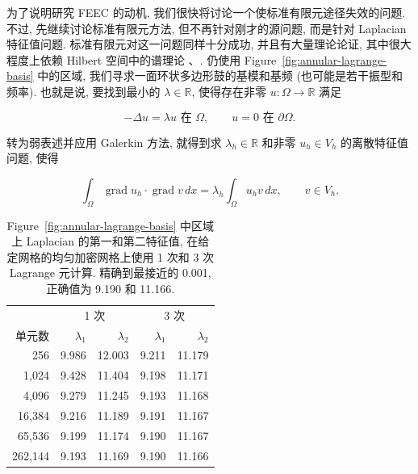 {为了说明研究 FEEC 的动机, 我们很快将讨论一个使标准有限元途径失效的问题. 不过, 先继续讨论标准有限元方法, 但不再针对刚才的源问题, 而是针对 Laplacian 特征值问题. 标准有限元对这一问题同样十分成功, 并且有大量理论论证, 其中很大程度上依赖 Hilbert 空间中的谱理论 、. 仍使用 Figure~\ref{fig:annular-lagrange-basis} 中的区域, 我们寻求一面环状多边形鼓的基模和基频 (也可能是若干振型和频率). 也就是说, 要找到最小的 $\lambda\in\mathbb R$, 使得存在非零 $u:\Omega\to\mathbb R$ 满足}

\begin{equation}\label{eq:scalar-laplacian-eigenproblem}
-\Delta u=\lambda u\text{{ 在 }}\Omega,\qquad u=0\text{{ 在 }}\partial\Omega.
\end{equation}

{转为弱表述并应用 Galerkin 方法, 就得到求 $\lambda_h\in\mathbb R$ 和非零 $u_h\in V_h$ 的离散特征值问题, 使得}

\[
\int_\Omega\operatorname{grad}u_h\cdot\operatorname{grad}v\,dx=\lambda_h\int_\Omega u_hv\,dx,\qquad v\in V_h.
\]

\begin{table}[H]\centering
\caption{{Figure~\ref{fig:annular-lagrange-basis} 中区域上 Laplacian 的第一和第二特征值, 在给定网格的均匀加密网格上使用 1 次和 3 次 Lagrange 元计算. 精确到最接近的 0.001, 正确值为 9.190 和 11.166.}}\label{tab:scalar-laplacian-eigenvalues}
\begin{tabular}{r|rr|rr}\hline
&\multicolumn{2}{c|}{{1 次}}&\multicolumn{2}{c}{{3 次}}\\
{单元数}&$\lambda_1$&$\lambda_2$&$\lambda_1$&$\lambda_2$\\\hline
256&9.986&12.003&9.211&11.179\\
1,024&9.428&11.404&9.198&11.171\\
4,096&9.279&11.245&9.193&11.168\\
16,384&9.216&11.189&9.191&11.167\\
65,536&9.199&11.174&9.190&11.167\\
262,144&9.193&11.169&9.190&11.166\\\hline
\end{tabular}
\end{table}


